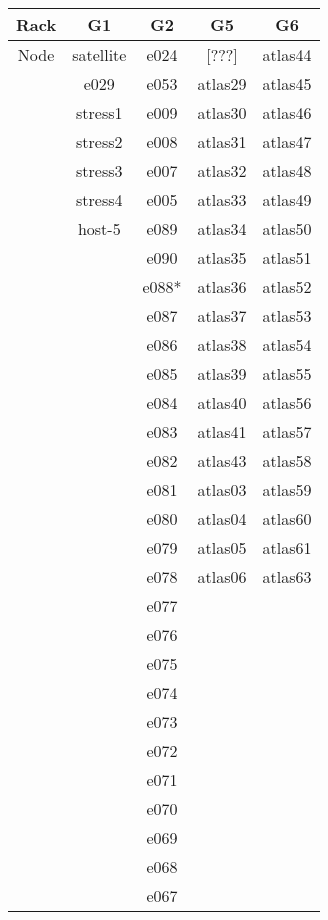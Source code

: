 \documentclass[10pt,letterpaper]{article}
\begin{document}
        \begin{center}
        \begin{tabular}{ |c|c|c|c|c| }
        \hline
        Rack & G1 & G2 & G5 & G6 \\
        \hline
        \multirow{1}{3em}{Node}

        & satellite & e024 & [???]   & atlas44 \\
        & e029    & e053   & atlas29 & atlas45 \\
        & stress1 & e009   & atlas30 & atlas46 \\
        & stress2 & e008   & atlas31 & atlas47 \\
        & stress3 & e007   & atlas32 & atlas48 \\
        & stress4 & e005   & atlas33 & atlas49 \\
        & host-5  & e089   & atlas34 & atlas50 \\
        &         & e090   & atlas35 & atlas51 \\
        &         & e088*  & atlas36 & atlas52 \\
        &         & e087   & atlas37 & atlas53 \\
        &         & e086   & atlas38 & atlas54 \\
        &         & e085   & atlas39 & atlas55 \\
        &         & e084   & atlas40 & atlas56 \\
        &         & e083   & atlas41 & atlas57 \\
        &         & e082   & atlas43 & atlas58 \\
        &         & e081   & atlas03 & atlas59 \\
        &         & e080   & atlas04 & atlas60 \\
        &         & e079   & atlas05 & atlas61 \\
        &         & e078   & atlas06 & atlas63 \\
        &         & e077 &&\\
        &         & e076 &&\\
        &         & e075 &&\\
        &         & e074 &&\\
        &         & e073 &&\\
        &         & e072 &&\\
        &         & e071 &&\\
        &         & e070 &&\\
        &         & e069 &&\\
        &         & e068 &&\\
        &         & e067 &&\\

        \hline
        \end{tabular}
        \end{center}
\end{document}
